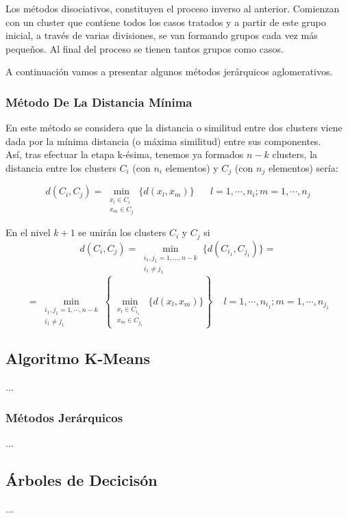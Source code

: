  Los métodos disociativos, constituyen el proceso inverso al anterior.  Comienzan con un cluster que contiene todos los casos tratados y a partir de este grupo inicial, a través de varias divisiones, se van formando grupos cada vez más pequeños.  Al final del proceso se tienen tantos grupos como casos. \par 

 A continuación vamos a presentar algunos métodos jerárquicos aglomerativos.
 
 \subsubsection*{Método De La Distancia Mínima}
 
 En este método se considera que la distancia o similitud entre dos clusters viene dada por la mínima distancia (o máxima similitud) entre sus componentes.
 \ \\
 Así, tras efectuar la etapa k-ésima, tenemos ya formados $n-k$ clusters, la distancia entre los clusters $C_{i}$ (con $n_{i}$ elementos) y $C_{j}$ (con $n_{j}$ elementos) sería:
 
$$d(C_{i},C_{j})= \min_{\substack {x_{l}\in C_{i}\\ x_{m}\in C_{j}}}\{d(x_{l},x_{m})\} \,\,\,\,\,\,\,\,\,\, l=1,\cdots,n_{i}; m=1,\cdots,n_{j}$$   
 
En el nivel $k+1$ se unirán los clusters $C_{i}$ y $C_{j}$ si	
$$d(C_{i},C_{j})= \min_{\substack {i_{1},j_{1}=1,...,n-k\\ i_{1}\neq j_{1}}} \{d(C_{i_{1}},C_{j_{1}})\}=$$
$$=\min_{\substack{i_{1},j_{1}=1,\cdots,n-k\\ i_{1}\neq j_{1}}} \left\{\min_{\substack{x_{l}\in C_{i_{1}}\\ x_{m}\in C_{j_{1}}}} \{d(x_{l},x_{m})\}\right\} \,\,\,\,\,\,\, l=1,\cdots,n_{i_{1}}; m=1,\cdots,n_{j_{1}}$$



\subsection{Algoritmo K-Means}

...

\subsubsection{Métodos Jerárquicos}

...


\subsection{Árboles de Decicisón}

...






\clearemptydoublepage
